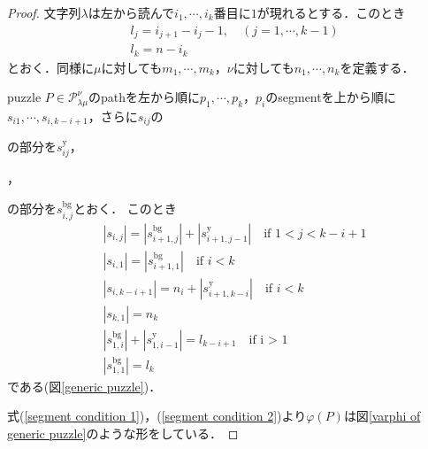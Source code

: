 \begin{proof}
  文字列$\lambda$は左から読んで$i_1,\cdots,i_k$番目に$1$が現れるとする．このとき
  \begin{align*}
    &l_j = i_{j+1} - i_{j} - 1,\quad (j=1,\cdots,k-1)\\
    &l_k = n - i_k
  \end{align*}
  とおく．同様に$\mu$に対しても$m_1,\cdots,m_{k}$，$\nu$に対しても$n_1,\cdots,n_{k}$を定義する．

  puzzle $P\in\mathcal{P}^\nu_{\lambda\mu}$のpathを左から順に$p_1,\cdots,p_k$，$p_i$のsegmentを上から順に$s_{i1},\cdots,s_{i,k-i+1}$，さらに$s_{ij}$の
  の部分を$s_{ij}^{\text{y}}$，
  ，
  の部分を$s_{i,j}^{\text{bg}}$とおく．
  このとき
  \begin{align}
    &|s_{i,j}| = |s_{i+1,j}^{\text{bg}}| + |s_{i+1,j-1}^{\text{y}}| \quad \text{if } 1 < j < k-i+1\label{segment condition 1}\\
    &|s_{i,1}| = |s_{i+1,1}^{\text{bg}}|\label{segment condition 2}\quad \text{if } i < k\\
    &|s_{i,k-i+1}| = n_i + |s_{i+1, k-i}^{\text{y}}| \quad \text{if } i < k\label{segment condition 3}\\
    &|s_{k,1}| = n_k\label{segment condition 4}\\
    &|s_{1,i}^{\text{bg}}| + |s_{1,i-1}^{\text{y}}| = l_{k-i+1}\quad \text{if i > 1}\label{segment condition 5}\\
    &|s_{1,1}^{\text{bg}}| = l_{k} 
  \end{align}
  である(図\ref{generic puzzle})．

  式(\ref{segment condition 1})，(\ref{segment condition 2})より$\varphi(P)$は図\ref{varphi of generic puzzle}のような形をしている．
  


\end{proof}
